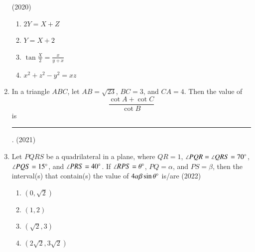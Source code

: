 \begin{enumerate}[label=\thesubsection.\arabic*,ref=\thesubsection.\theenumi]
		\hfill (2020)
	\begin{multicols}{2}
    \begin{enumerate}
        \item  $2Y = X + Z$
        \item  $Y = X + 2$
	\item  $\tan\frac{X}{2} = \frac{x}{y + x}$        
	\item  $x^2 + z^2 - y^2 = xz$
    \end{enumerate}
\end{multicols}
    \item In a triangle $ABC$, let $AB = \sqrt{23}$, $BC = 3$, and $CA = 4$. Then the value of  
    \[
    \frac{\cot A + \cot C}{\cot B}
    \]  
    is \rule{1cm}{0.1pt}.
%
    \hfill (2021)
\item Let $PQRS$ be a quadrilateral in a plane, where $QR = 1$, $\angle PQR = \angle QRS = 70\degree$, $\angle PQS = 15\degree$, and $\angle PRS = 40\degree$. If $\angle RPS = \theta\degree$, $PQ = \alpha$, and $PS = \beta$, then the interval(s) that contain(s) the value of $4\alpha\beta\sin\theta\degree$ is/are
\hfill (2022)     
\begin{multicols}{4}     \begin{enumerate}
         \item $(0, \sqrt{2})$
         \item $(1, 2)$
         \item $(\sqrt{2}, 3)$
         \item $(2\sqrt{2}, 3\sqrt{2})$
    \end{enumerate} \end{multicols}
\end{enumerate}
